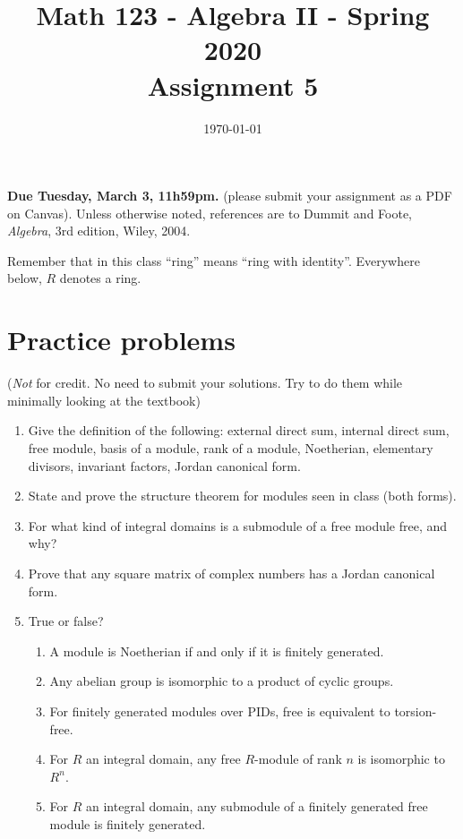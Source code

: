 \documentclass{amsart}
\title[Math 123, Spring 2020: assignment 5]{Math 123 - Algebra II - Spring 2020 \\ Assignment 5}
\date{\today}
\theoremstyle{definition}
\begin{document}

\vspace*{-10em}
\maketitle

\textbf{Due Tuesday, March 3, 11h59pm.} (please submit your assignment as a PDF on Canvas). Unless otherwise noted, references are to Dummit and Foote, \emph{Algebra}, 3rd edition, Wiley, 2004.

Remember that in this class ``ring'' means ``ring with identity''. Everywhere below, $R$ denotes a ring.

\section*{Practice problems} (\emph{Not} for credit. No need to submit your solutions. Try to do them while minimally looking at the textbook)

\begin{enumerate}
\item Give the definition of the following: external direct sum, internal direct sum, free module, basis of a module, rank of a module, Noetherian, elementary divisors, invariant factors, Jordan canonical form.
\item State and prove the structure theorem for modules seen in class (both forms).
\item For what kind of integral domains is a submodule of a free module free, and why?
\item Prove that any square matrix of complex numbers has a Jordan canonical form.
\item True or false?
  \begin{enumerate}
  \item A module is Noetherian if and only if it is finitely generated.
  \item Any abelian group is isomorphic to a product of cyclic groups.
  \item For finitely generated modules over PIDs, free is equivalent to torsion-free.
  \item For $R$ an integral domain, any free $R$-module of rank $n$ is isomorphic to $R^n$.
  \item For $R$ an integral domain, any submodule of a finitely generated free module is finitely generated.
  \end{enumerate}
\end{enumerate}
\end{document}
